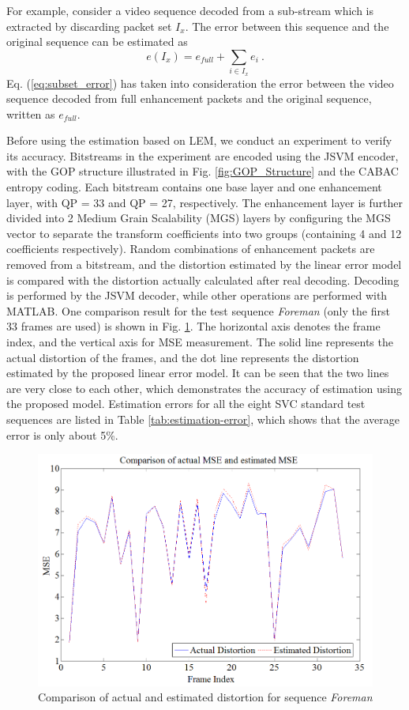 \documentclass[journal]{IEEEtran}
\begin{document}
For example, consider a video sequence decoded from a sub-stream which is extracted by discarding packet set $I_x$. The error between this sequence and the original sequence can be estimated as
\begin{equation}
\label{eq:subset_error}
e(I_x) = e_{full} + \sum_{i \in {I_x}} e_i \: .
\end{equation}
Eq. (\ref{eq:subset_error}) has taken into consideration the error between the video sequence decoded from full enhancement packets and the original sequence, written as $e_{full}$.

Before using the estimation based on LEM, we conduct an experiment to verify its accuracy. Bitstreams in the experiment are encoded using the JSVM encoder, with the GOP structure illustrated in Fig. \ref{fig:GOP_Structure} and the CABAC entropy coding. Each bitstream contains one base layer and one enhancement layer, with QP = 33 and QP = 27, respectively. The enhancement layer is further divided into 2 Medium Grain Scalability (MGS) layers by configuring the MGS vector to separate the transform coefficients into two groups (containing 4 and 12 coefficients respectively). Random combinations of enhancement packets are removed from a bitstream, and the distortion estimated by the linear error model is compared with the distortion actually calculated after real decoding. Decoding is performed by the JSVM decoder, while other operations are performed with MATLAB. One comparison result for the test sequence {\em Foreman} (only the first 33 frames are used) is shown in Fig. \ref{fig:model_verification}. The horizontal axis denotes the frame index, and the vertical axis for MSE measurement. The solid line represents the actual distortion of the frames, and the dot line represents the distortion estimated by the proposed linear error model. It can be seen that the two lines are very close to each other, which demonstrates the accuracy of estimation using the proposed model. Estimation errors for all the eight SVC standard test sequences are listed in Table \ref{tab:estimation-error}, which shows that the average error is only about 5\%.

\begin{figure}[t]
\centering
\includegraphics[width = 0.9\linewidth]{ModelVerification.png}
\caption{Comparison of actual and estimated distortion for sequence {\em Foreman} \label{fig:model_verification}}
\end{figure}
\end{document}
